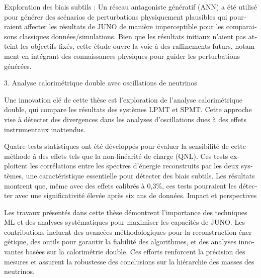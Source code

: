 \documentclass[../main.tex]{subfiles}
\begin{document}
\begin{otherlanguage}{french}
    Exploration des biais subtils : Un réseau antagoniste génératif (ANN) a été utilisé pour générer des scénarios de perturbations physiquement plausibles qui pourraient affecter les résultats de JUNO de manière imperceptible pour les comparaisons classiques données/simulations. Bien que les résultats initiaux n'aient pas atteint les objectifs fixés, cette étude ouvre la voie à des raffinements futurs, notamment en intégrant des connaissances physiques pour guider les perturbations générées.

3. Analyse calorimétrique double avec oscillations de neutrinos

Une innovation clé de cette thèse est l'exploration de l'analyse calorimétrique double, qui compare les résultats des systèmes LPMT et SPMT. Cette approche vise à détecter des divergences dans les analyses d'oscillations dues à des effets instrumentaux inattendus.

Quatre tests statistiques ont été développés pour évaluer la sensibilité de cette méthode à des effets tels que la non-linéarité de charge (QNL). Ces tests exploitent les corrélations entre les spectres d'énergie reconstruits par les deux systèmes, une caractéristique essentielle pour détecter des biais subtils. Les résultats montrent que, même avec des effets calibrés à 0,3\%, ces tests pourraient les détecter avec une significativité élevée après six ans de données.
Impact et perspectives

Les travaux présentés dans cette thèse démontrent l'importance des techniques ML et des analyses systématiques pour maximiser les capacités de JUNO. Les contributions incluent des avancées méthodologiques pour la reconstruction énergétique, des outils pour garantir la fiabilité des algorithmes, et des analyses innovantes basées sur la calorimétrie double. Ces efforts renforcent la précision des mesures et assurent la robustesse des conclusions sur la hiérarchie des masses des neutrinos.

\end{otherlanguage}
\end{document}

